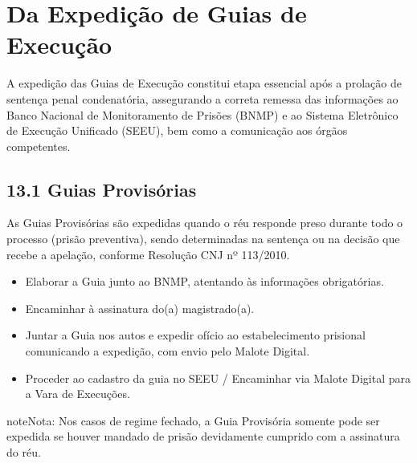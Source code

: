 \documentclass[letterpaper,10pt,brazil]{sphinxmanual}
\begin{document}
\sphinxstepscope


\section{Da Expedição de Guias de Execução}
\label{\detokenize{10expedir_guia_execucao:da-expedicao-de-guias-de-execucao}}\label{\detokenize{10expedir_guia_execucao::doc}}
\sphinxAtStartPar
A expedição das Guias de Execução constitui etapa essencial após a prolação de sentença penal condenatória, assegurando a correta remessa das informações ao Banco Nacional de Monitoramento de Prisões (BNMP) e ao Sistema Eletrônico de Execução Unificado (SEEU), bem como a comunicação aos órgãos competentes.


\subsection{13.1 \textendash{} Guias Provisórias}
\label{\detokenize{10expedir_guia_execucao:guias-provisorias}}
\sphinxAtStartPar
As Guias Provisórias são expedidas quando o réu responde preso durante todo o processo (prisão preventiva), sendo determinadas na sentença ou na decisão que recebe a apelação, conforme Resolução CNJ nº 113/2010.

\sphinxAtStartPar
{}
\begin{itemize}
\item {} 
\sphinxAtStartPar
Elaborar a Guia junto ao BNMP, atentando às informações obrigatórias.

\item {} 
\sphinxAtStartPar
Encaminhar à assinatura do(a) magistrado(a).

\item {} 
\sphinxAtStartPar
Juntar a Guia nos autos e expedir ofício ao estabelecimento prisional comunicando a expedição, com envio pelo Malote Digital.

\item {} 
\sphinxAtStartPar
Proceder ao cadastro da guia no SEEU / Encaminhar via Malote Digital para a Vara de Execuções.

\end{itemize}

\begin{sphinxadmonition}{note}{Nota:}
\sphinxAtStartPar
Nos casos de regime fechado, a Guia Provisória somente pode ser expedida se houver mandado de prisão devidamente cumprido com a assinatura do réu.
\end{sphinxadmonition}
\end{document}
